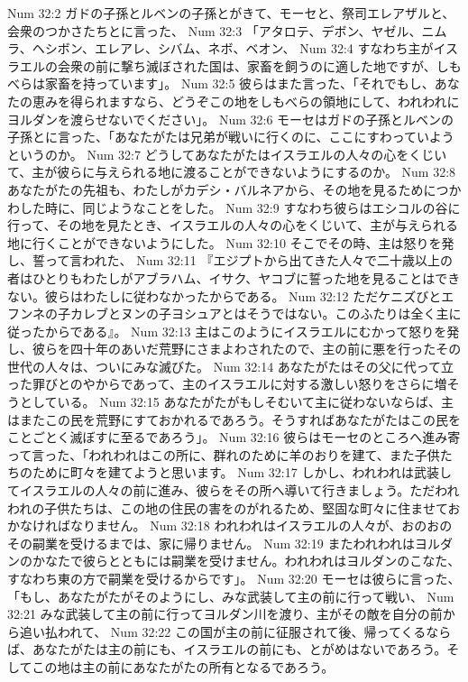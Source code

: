 Num 32:2  ガドの子孫とルベンの子孫とがきて、モーセと、祭司エレアザルと、会衆のつかさたちとに言った、
Num 32:3  「アタロテ、デボン、ヤゼル、ニムラ、ヘシボン、エレアレ、シバム、ネボ、ベオン、
Num 32:4  すなわち主がイスラエルの会衆の前に撃ち滅ぼされた国は、家畜を飼うのに適した地ですが、しもべらは家畜を持っています」。
Num 32:5  彼らはまた言った、「それでもし、あなたの恵みを得られますなら、どうぞこの地をしもべらの領地にして、われわれにヨルダンを渡らせないでください」。
Num 32:6  モーセはガドの子孫とルベンの子孫とに言った、「あなたがたは兄弟が戦いに行くのに、ここにすわっていようというのか。
Num 32:7  どうしてあなたがたはイスラエルの人々の心をくじいて、主が彼らに与えられる地に渡ることができないようにするのか。
Num 32:8  あなたがたの先祖も、わたしがカデシ・バルネアから、その地を見るためにつかわした時に、同じようなことをした。
Num 32:9  すなわち彼らはエシコルの谷に行って、その地を見たとき、イスラエルの人々の心をくじいて、主が与えられる地に行くことができないようにした。
Num 32:10  そこでその時、主は怒りを発し、誓って言われた、
Num 32:11  『エジプトから出てきた人々で二十歳以上の者はひとりもわたしがアブラハム、イサク、ヤコブに誓った地を見ることはできない。彼らはわたしに従わなかったからである。
Num 32:12  ただケニズびとエフンネの子カレブとヌンの子ヨシュアとはそうではない。このふたりは全く主に従ったからである』。
Num 32:13  主はこのようにイスラエルにむかって怒りを発し、彼らを四十年のあいだ荒野にさまよわされたので、主の前に悪を行ったその世代の人々は、ついにみな滅びた。
Num 32:14  あなたがたはその父に代って立った罪びとのやからであって、主のイスラエルに対する激しい怒りをさらに増そうとしている。
Num 32:15  あなたがたがもしそむいて主に従わないならば、主はまたこの民を荒野にすておかれるであろう。そうすればあなたがたはこの民をことごとく滅ぼすに至るであろう」。
Num 32:16  彼らはモーセのところへ進み寄って言った、「われわれはこの所に、群れのために羊のおりを建て、また子供たちのために町々を建てようと思います。
Num 32:17  しかし、われわれは武装してイスラエルの人々の前に進み、彼らをその所へ導いて行きましょう。ただわれわれの子供たちは、この地の住民の害をのがれるため、堅固な町々に住ませておかなければなりません。
Num 32:18  われわれはイスラエルの人々が、おのおのその嗣業を受けるまでは、家に帰りません。
Num 32:19  またわれわれはヨルダンのかなたで彼らとともには嗣業を受けません。われわれはヨルダンのこなた、すなわち東の方で嗣業を受けるからです」。
Num 32:20  モーセは彼らに言った、「もし、あなたがたがそのようにし、みな武装して主の前に行って戦い、
Num 32:21  みな武装して主の前に行ってヨルダン川を渡り、主がその敵を自分の前から追い払われて、
Num 32:22  この国が主の前に征服されて後、帰ってくるならば、あなたがたは主の前にも、イスラエルの前にも、とがめはないであろう。そしてこの地は主の前にあなたがたの所有となるであろう。
